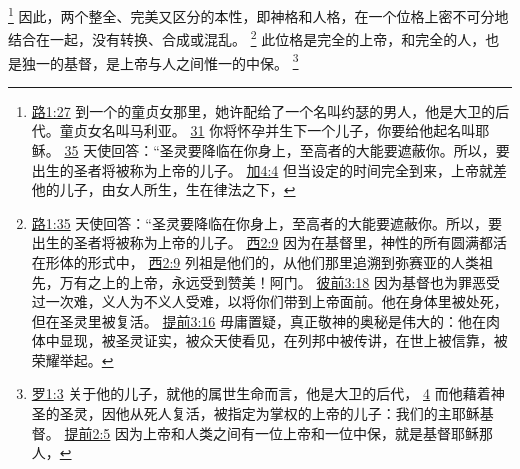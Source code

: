 \documentclass[12pt, a4paper, oneside]{ctexart}
\begin{document}
	\footnote {
		\href{https://biblehub.com/luke/1-27.htm}{路1:27} 到一个的童贞女那里，她许配给了一个名叫约瑟的男人，他是大卫的后代。童贞女名叫马利亚。
		\href{https://biblehub.com/luke/1-31.htm}{31} 你将怀孕并生下一个儿子，你要给他起名叫耶稣。
		\href{https://biblehub.com/luke/1-35.htm}{35} 天使回答：“圣灵要降临在你身上，至高者的大能要遮蔽你。所以，要出生的圣者将被称为上帝的儿子。
		\href{https://biblehub.com/galatians/4-4.htm}{加4:4} 但当设定的时间完全到来，上帝就差他的儿子，由女人所生，生在律法之下，
	}
	因此，两个整全、完美又区分的本性，即神格和人格，在一个位格上密不可分地结合在一起，没有转换、合成或混乱。
	\footnote {
		\href{https://biblehub.com/luke/1-35.htm}{路1:35} 天使回答：“圣灵要降临在你身上，至高者的大能要遮蔽你。所以，要出生的圣者将被称为上帝的儿子。
		\href{https://biblehub.com/colossians/2-9.htm}{西2:9} 因为在基督里，神性的所有圆满都活在形体的形式中，
		\href{https://biblehub.com/romans/9-5.htm}{西2:9} 列祖是他们的，从他们那里追溯到弥赛亚的人类祖先，万有之上的上帝，永远受到赞美！阿门。
		\href{https://biblehub.com/1_peter/3-18.htm}{彼前3:18} 因为基督也为罪恶受过一次难，义人为不义人受难，以将你们带到上帝面前。他在身体里被处死，但在圣灵里被复活。
		\href{https://biblehub.com/1_timothy/3-16.htm}{提前3:16} 毋庸置疑，真正敬神的奥秘是伟大的：他在肉体中显现，被圣灵证实，被众天使看见，在列邦中被传讲，在世上被信靠，被荣耀举起。
	}
	此位格是完全的上帝，和完全的人，也是独一的基督，是上帝与人之间惟一的中保。
	\footnote {
		\href{https://biblehub.com/romans/1-3.htm}{罗1:3} 关于他的儿子，就他的属世生命而言，他是大卫的后代，
		\href{https://biblehub.com/romans/1-4.htm}{4} 而他藉着神圣的圣灵，因他从死人复活，被指定为掌权的上帝的儿子：我们的主耶稣基督。
		\href{https://biblehub.com/1_timothy/2-5.htm}{提前2:5} 因为上帝和人类之间有一位上帝和一位中保，就是基督耶稣那人，
	}
\end{document}
